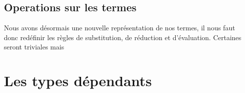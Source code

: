 \documentclass {article}
\theoremstyle{definition}
\theoremstyle{remark}
\begin{document}
\subsection{Operations sur les termes}

Nous avons désormais une nouvelle représentation de nos termes, il nous faut donc 
redéfinir les règles de substitution, de réduction et d'évaluation.
Certaines seront triviales mais 


\section{Les types dépendants}







\end{document}
